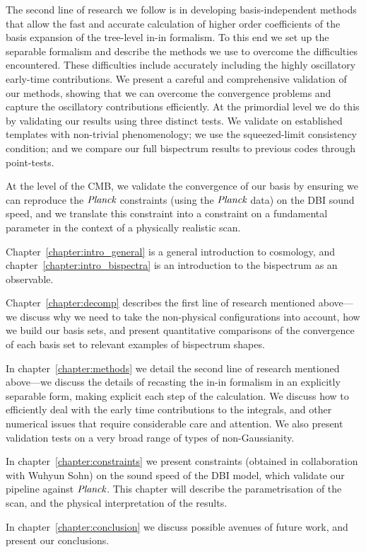 The second line of research we follow is in developing basis-independent methods that allow the fast and accurate calculation
of higher order coefficients of the basis expansion of the tree-level in-in formalism.
To this end we set up the separable formalism and describe the methods we use to overcome the difficulties encountered.
These difficulties include accurately including the highly oscillatory early-time contributions.
We present a careful and comprehensive validation of our methods,
showing that we can overcome the convergence problems and capture the oscillatory contributions efficiently.
At the primordial level we do this by validating our results using three distinct tests.
We validate on established templates with non-trivial
phenomenology; we use the squeezed-limit consistency condition; and we compare our
full bispectrum results to previous codes through point-tests.


At the level of the CMB, we validate the convergence of our basis by ensuring we can reproduce the
$\textit{Planck}$ constraints (using the $\textit{Planck}$ data) on the DBI sound speed, and we translate this constraint into a constraint on
a fundamental parameter in the context of a physically realistic scan.



Chapter~\ref{chapter:intro_general} is a general introduction to cosmology, and
chapter~\ref{chapter:intro_bispectra} is an introduction to the bispectrum as an observable.


Chapter~\ref{chapter:decomp} describes the first line of research mentioned above---we
discuss why we need to take the non-physical configurations into account, how we build our
basis sets, and present quantitative comparisons of the convergence of each basis set to
relevant examples of bispectrum shapes.


In chapter~\ref{chapter:methods} we detail the second line of research mentioned above---we
discuss the details of recasting the in-in formalism in an explicitly separable form,
making explicit each step of the calculation.
We discuss how to efficiently deal with the early time contributions to the integrals,
and other numerical issues that require considerable care and attention.
We also present validation tests on a very broad range of types of non-Gaussianity.


In chapter~\ref{chapter:constraints} we present constraints (obtained in collaboration with Wuhyun Sohn)
on the sound speed of the DBI model, which validate our pipeline against $\textit{Planck}$.
This chapter will describe the parametrisation of the scan, and the physical
interpretation of the results.


In chapter~\ref{chapter:conclusion} we discuss possible avenues of future work, and present our conclusions.

